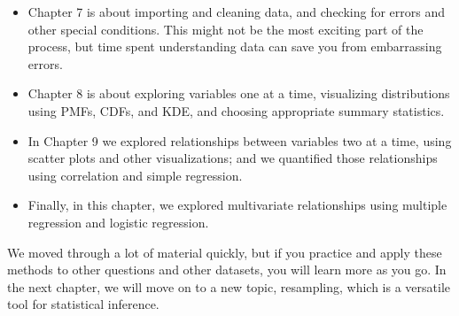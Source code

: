 \begin{itemize}
\item
  Chapter 7 is about importing and cleaning data, and checking for
  errors and other special conditions. This might not be the most
  exciting part of the process, but time spent understanding data can
  save you from embarrassing errors.
\item
  Chapter 8 is about exploring variables one at a time, visualizing
  distributions using PMFs, CDFs, and KDE, and choosing appropriate
  summary statistics.
\item
  In Chapter 9 we explored relationships between variables two at a
  time, using scatter plots and other visualizations; and we quantified
  those relationships using correlation and simple regression.
\item
  Finally, in this chapter, we explored multivariate relationships using
  multiple regression and logistic regression.
\end{itemize}

We moved through a lot of material quickly, but if you practice and
apply these methods to other questions and other datasets, you will
learn more as you go. In the next chapter, we will move on to a new
topic, resampling, which is a versatile tool for statistical inference.


